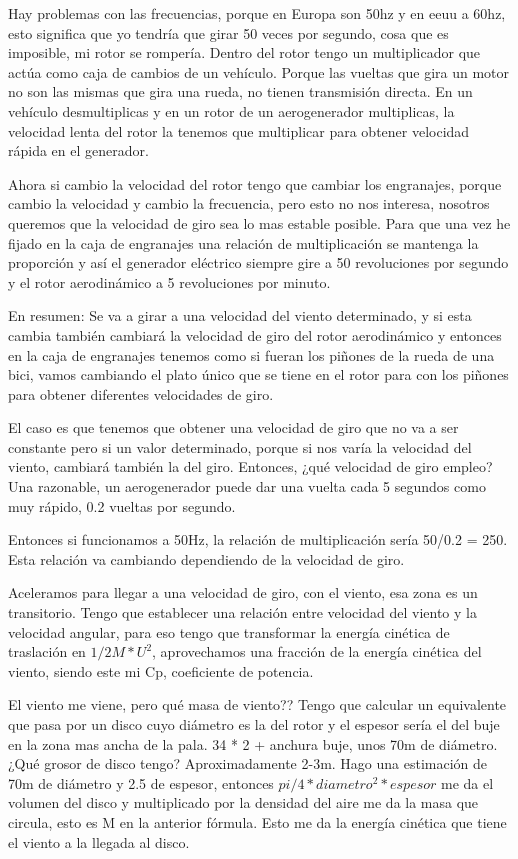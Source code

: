 Hay problemas con las frecuencias, porque en Europa son 50hz y en eeuu a 60hz, esto significa que yo tendría que girar 50 veces por segundo, cosa que es imposible, mi rotor se rompería. Dentro del rotor tengo un multiplicador que actúa como caja de cambios de un vehículo. Porque las vueltas que gira un motor no son las mismas que gira una rueda, no tienen transmisión directa. En un vehículo desmultiplicas y en un rotor de un aerogenerador multiplicas, la velocidad lenta del rotor la tenemos que multiplicar para obtener velocidad rápida en el generador. 


Ahora si cambio la velocidad del rotor tengo que cambiar los engranajes, porque cambio la velocidad y cambio la frecuencia, pero esto no nos interesa, nosotros queremos que la velocidad de giro sea lo mas estable posible. Para que una vez he fijado en la caja de engranajes una relación de multiplicación se mantenga la proporción y así el generador eléctrico siempre gire a 50 revoluciones por segundo y el rotor aerodinámico a 5 revoluciones por minuto.

En resumen: Se va a girar a una velocidad del viento determinado, y si esta cambia también cambiará la velocidad de giro del rotor aerodinámico y entonces en la caja de engranajes tenemos como si fueran los piñones de la rueda de una bici, vamos cambiando el plato único que se tiene en el rotor para con los piñones para obtener diferentes velocidades de giro.

El caso es que tenemos que obtener una velocidad de giro que no va a ser constante pero si un valor determinado, porque si nos varía la velocidad del viento, cambiará también la del giro. Entonces, ¿qué velocidad de giro empleo? Una razonable, un aerogenerador puede dar una vuelta cada 5 segundos como muy rápido, 0.2 vueltas por segundo.

Entonces si funcionamos a 50Hz, la relación de multiplicación sería 50/0.2 = 250. Esta relación va cambiando dependiendo de la velocidad de giro.

Aceleramos para llegar a una velocidad de giro, con el viento, esa zona es un transitorio. Tengo que establecer una relación entre velocidad del viento y la velocidad angular, para eso tengo que transformar la energía cinética de traslación en $1/2 M * U^2$, aprovechamos una fracción de la energía cinética del viento, siendo este mi Cp, coeficiente de potencia. 

El viento me viene, pero qué masa de viento?? Tengo que calcular un equivalente que pasa por un disco cuyo diámetro es la del rotor y el espesor sería el del buje en la zona mas ancha de la pala. 34 * 2 + anchura buje, unos 70m de diámetro. ¿Qué grosor de disco tengo? Aproximadamente 2-3m. Hago una estimación de 70m de diámetro y 2.5 de espesor, entonces $pi/4 * diametro^2 * espesor$ me da el volumen del disco y multiplicado por la densidad del aire me da la masa que circula, esto es M en la anterior fórmula. Esto me da la energía cinética que tiene el viento a la llegada al disco.

